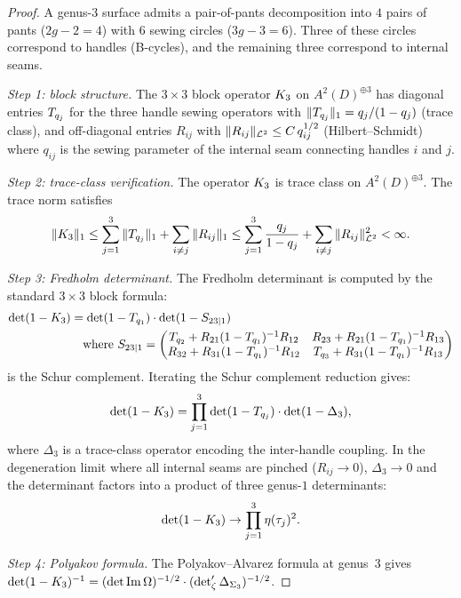 \begin{proof}
A genus-$3$ surface admits a pair-of-pants decomposition into
$4$ pairs of pants ($2g - 2 = 4$) with $6$ sewing circles
($3g - 3 = 6$). Three of these circles correspond to handles
(B-cycles), and the remaining three correspond to internal
seams.

\emph{Step 1: block structure.}
The $3 \times 3$ block operator $K_3$ on
$A^2(D)^{\oplus 3}$ has diagonal entries $T_{q_j}$
for the three handle sewing operators with
$\|T_{q_j}\|_1 = q_j/(1-q_j)$ (trace class), and
off-diagonal entries $R_{ij}$ with
$\|R_{ij}\|_{\mathcal{L}^2} \leq C\,q_{ij}^{1/2}$
(Hilbert--Schmidt) where $q_{ij}$ is the sewing parameter
of the internal seam connecting handles $i$ and $j$.

\emph{Step 2: trace-class verification.}
The operator $K_3$ is trace class on $A^2(D)^{\oplus 3}$.
The trace norm satisfies
\[
\|K_3\|_1
\leq \sum_{j=1}^{3} \|T_{q_j}\|_1
+ \sum_{i \neq j} \|R_{ij}\|_1
\leq \sum_{j=1}^{3} \frac{q_j}{1-q_j}
+ \sum_{i \neq j}
\|R_{ij}\|_{\mathcal{L}^2}^2
< \infty.
\]

\emph{Step 3: Fredholm determinant.}
The Fredholm determinant is computed by the standard $3 \times 3$
block formula:
\begin{align}
\det(1 - K_3)
&= \det(1 - T_{q_1})
\cdot \det(1 - S_{23|1})
\notag\\
&\quad\text{where } S_{23|1}
= \begin{pmatrix} T_{q_2} + R_{21}(1-T_{q_1})^{-1}R_{12}
& R_{23} + R_{21}(1-T_{q_1})^{-1}R_{13}\\
R_{32} + R_{31}(1-T_{q_1})^{-1}R_{12}
& T_{q_3} + R_{31}(1-T_{q_1})^{-1}R_{13}
\end{pmatrix}
\notag
\end{align}
is the Schur complement. Iterating the Schur complement
reduction gives:
\begin{equation}\label{eq:thqg-X-genus-3-iterated-schur}
\det(1 - K_3)
= \prod_{j=1}^{3} \det(1 - T_{q_j})
\cdot \det(1 - \Delta_3),
\end{equation}
where $\Delta_3$ is a trace-class operator encoding the
inter-handle coupling. In the degeneration limit where all
internal seams are pinched ($R_{ij} \to 0$), $\Delta_3 \to 0$
and the determinant factors into a product of three genus-$1$
determinants:
\[
\det(1 - K_3)
\to
\prod_{j=1}^{3}
\eta(\tau_j)^2.
\]

\emph{Step 4: Polyakov formula.}
The Polyakov--Alvarez formula at genus~$3$ gives
$\det(1-K_3)^{-1}
= (\det\operatorname{Im}\Omega)^{-1/2}
\cdot (\det\nolimits'_\zeta\Delta_{\Sigma_3})^{-1/2}$.
\end{proof}

